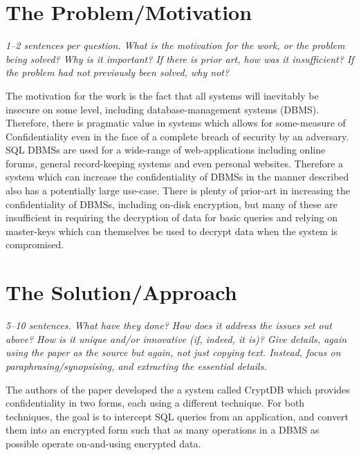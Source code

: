 \documentclass[11pt]{article}
\begin{document}
\section*{The Problem/Motivation}

\textsl{1--2 sentences per question. What is the motivation for the work, or
the problem being solved? Why is it important? If there is prior art, how was
it insufficient? If the problem had not previously been solved, why not?}

The motivation for the work is the fact that all systems will inevitably be
insecure on some level, including database-management systems (DBMS).
Therefore, there is pragmatic value in systems which allows for some-measure of
Confidentiality even in the face of a complete breach of security by an
adversary. SQL DBMSs are used for a wide-range of web-applications including
online forums, general record-keeping systems and even personal websites.
Therefore a system which can increase the confidentiality of DBMSs in the
manner described also has a potentially large use-case. There is plenty of
prior-art in increasing the confidentiality of DBMSs, including on-disk
encryption, but many of these are insufficient in requiring the decryption of
data for basic queries and relying on master-keys which can themselves be used
to decrypt data when the system is compromised.

\section*{The Solution/Approach}

\textsl{5--10 sentences. What have they done? How does it address the issues
set out above? How is it unique and/or innovative (if, indeed, it is)? Give
details, again using the paper as the source but again, not just copying text.
Instead, focus on paraphrasing/synopsising, and extracting the essential
details.}

The authors of the paper developed the a system called CryptDB which provides
confidentiality in two forms, each using a different technique. For both
techniques, the goal is to intercept SQL queries from an application, and
convert them into an encrypted form such that as many operations in a DBMS as
possible operate on-and-using encrypted data.
\end{document}
